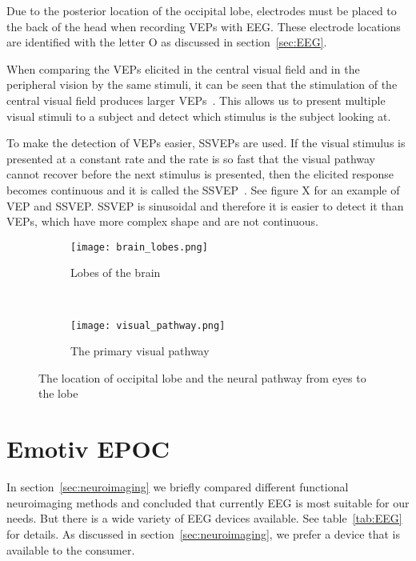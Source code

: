 Due to the posterior location of the occipital lobe, electrodes must be placed to the back of the head when recording \glspl{VEP} with \gls{EEG}. These electrode locations are identified with the letter O as discussed in section~\ref{sec:EEG}.

When comparing the \glspl{VEP} elicited in the central visual field and in the peripheral vision by the same stimuli, it can be seen that the stimulation of the central visual field produces larger \glspl{VEP}~\cite{VEP_size}. This allows us to present multiple visual stimuli to a subject and detect which stimulus is the subject looking at. 

To make the detection of \glspl{VEP} easier, \glspl{SSVEP} are used. If the visual stimulus is presented at a constant rate and the rate is so fast that the visual pathway cannot recover before the next stimulus is presented, then the elicited response becomes continuous and it is called the \gls{SSVEP}~\cite{VEP}. See figure X for an example of \gls{VEP} and \gls{SSVEP}. \gls{SSVEP} is sinusoidal and therefore it is easier to detect it than \glspl{VEP}, which have more complex shape and are not continuous.

\begin{figure}[h]
	\centering
	\begin{subfigure}{0.48\textwidth}
		\texttt{[image: brain\_lobes.png]}
		\caption{Lobes of the brain~\cite{blausen}}
		\label{fig:brain_lobes}
	\end{subfigure}
	~
	\begin{subfigure}{0.48\textwidth}
		\texttt{[image: visual\_pathway.png]}
		\caption{The primary visual pathway~\cite[p.~261]{neuroscience}}
		\label{fig:visual_pathway}
	\end{subfigure}
	\caption{The location of occipital lobe and the neural pathway from eyes to the lobe}
	\label{fig:lobes_pathway}
\end{figure}

\section{Emotiv EPOC}
\label{sec:EEG_comparison}

In section~\ref{sec:neuroimaging} we briefly compared different functional neuroimaging methods and concluded that currently \gls{EEG} is most suitable for our needs. But there is a wide variety of EEG devices available. See table~\ref{tab:EEG} for details. As discussed in section~\ref{sec:neuroimaging}, we prefer a device that is available to the consumer.

